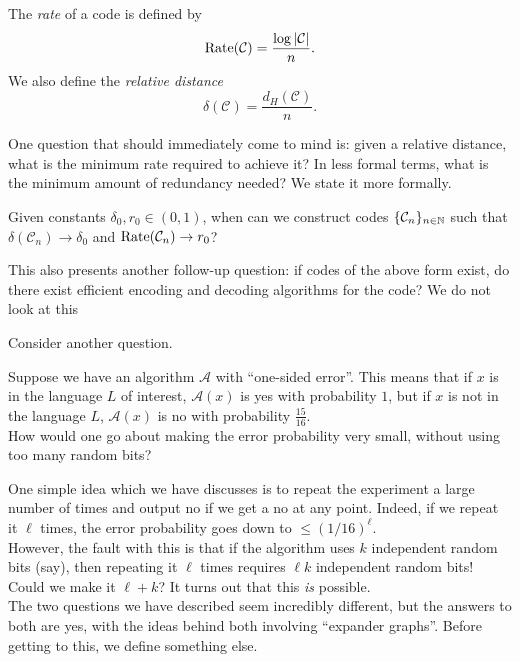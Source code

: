 			\begin{definition}
				The \emph{rate} of a code is defined by
				\[ \operatorname{Rate}(\mathcal{C}) = \frac{\log |\mathcal{C}|}{n}. \]
				We also define the \emph{relative distance}
				\[ \delta(\mathcal{C}) = \frac{d_H(\mathcal{C})}{n}. \]
			\end{definition}

			One question that should immediately come to mind is: given a relative distance, what is the minimum rate required to achieve it? In less formal terms, what is the minimum amount of redundancy needed? We state it more formally.

			\begin{problem*}
				Given constants $\delta_0,r_0 \in (0,1)$, when can we construct codes $\{\mathcal{C}_n\}_{n \in \mathbb{N}}$ such that $\delta(\mathcal{C}_n) \to \delta_0$ and $\operatorname{Rate}(\mathcal{C}_n) \to r_0$?
			\end{problem*}
			This also presents another follow-up question: if codes of the above form exist, do there exist efficient encoding and decoding algorithms for the code? We do not look at this


			Consider another question.
			\begin{problem*}
				Suppose we have an algorithm $\mathcal{A}$ with ``one-sided error''. This means that if $x$ is in the language $L$ of interest, $\mathcal{A}(x)$ is yes with probability $1$, but if $x$ is not in the language $L$, $\mathcal{A}(x)$ is no with probability $\frac{15}{16}$.\\
				How would one go about making the error probability very small, without using too many random bits?
			\end{problem*}

			One simple idea which we have discusses is to repeat the experiment a large number of times and output no if we get a no at any point. Indeed, if we repeat it $\ell$ times, the error probability goes down to $\le (1/16)^{\ell}$. \\
			However, the fault with this is that if the algorithm uses $k$ independent random bits (say), then repeating it $\ell$ times requires $\ell k$ independent random bits! Could we make it $\ell+k$? It turns out that this \emph{is} possible.\\

			The two questions we have described seem incredibly different, but the answers to both are yes, with the ideas behind both involving ``expander graphs''. Before getting to this, we define something else. \\

